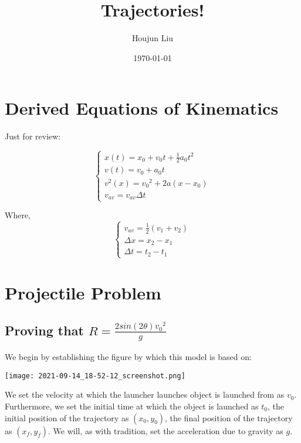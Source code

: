 \documentclass[letterpaper]{article}
\author{Houjun Liu}
\date{\today}
\title{Trajectories!}
\renewcommand\maketitle{}
\begin{document}
\maketitle

\section{Derived Equations of Kinematics}
\label{sec:orgf3f08c2}
Just for review: 

\begin{equation}
    \begin{cases}
        x(t) = x_0 + v_0 t + \frac{1}{2} a_0 t^2 \\
        v(t) = v_0 + a_0 t \\
        v^2(x) = {v_0}^2 + 2a(x-x_0) \\
        v_{av} = v_{av}\Delta t
    \end{cases}
\end{equation}

Where,
\begin{equation}
    \begin{cases}
        v_{av} = \frac{1}{2}(v_1+v_2) \\
        \Delta x = x_2-x_1 \\
        \Delta t = t_2-t_1
    \end{cases}
\end{equation}

\section{Projectile Problem}
\label{sec:org6c5ebbc}

\subsection{Proving that \(R = \frac{2sin(2\theta){v_0}^2}{g}\)}
\label{sec:org2896f74}
We begin by establishing the figure by which this model is based on:

\begin{center}
\texttt{[image: 2021-09-14\_18-52-12\_screenshot.png]}
\end{center}


We set the velocity at which the launcher launches object is launched from as \(v_0\). Furthermore, we set the initial time at which the object is launched as \(t_0\), the initial position of the trajectory as \((x_0, y_0)\), the final position of the trajectory as \((x_f,y_f)\). We will, as with tradition, set the acceleration due to gravity as \(g\).
\end{document}
